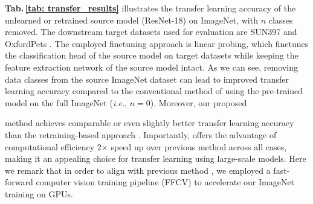 {\textbf{Tab.\,\ref{tab: transfer_results}} illustrates the transfer learning accuracy of the unlearned or retrained source model (ResNet-18) on ImageNet, with $n$ classes removed. The downstream target datasets used for evaluation are  SUN397 \cite{xiao2010sun} and OxfordPets \cite{parkhi2012cats}.
The  employed finetuning approach   is linear probing, which finetunes the classification head of the source model on target datasets while keeping the feature extraction network of the source model intact. 
As we can see, removing data classes from the source ImageNet dataset    can lead to improved transfer learning accuracy compared to the conventional method of using the pre-trained model on the full ImageNet  (\textit{i.e.}, $n = 0$). Moreover,
our proposed 

{\MUSparse} method achieves comparable or even slightly better 
transfer learning accuracy than the retraining-based approach \citep{jain2022data}.  Importantly, {\MUSparse} offers the advantage of computational efficiency 2$\times$ speed up over previous method \citep{jain2022data} across all cases, making it an appealing choice for transfer learning using large-scale models.
Here we remark that in order to align with previous method \cite{jain2022data}, we employed a fast-forward computer vision training pipeline  (FFCV) \citep{leclerc2022ffcv}
to accelerate our ImageNet training on GPUs.


}
